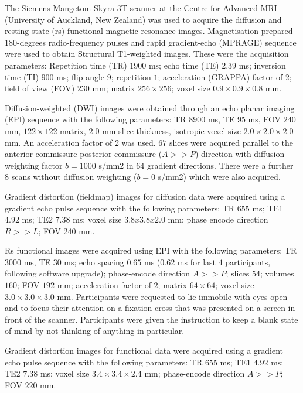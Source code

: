 The Siemens Mangetom Skyra 3T scanner at the Centre for Advanced MRI (University of Auckland, New Zealand) was used to acquire the diffusion and resting-state (rs) functional magnetic resonance images. Magnetisation prepared 180-degrees radio-frequency pulses and rapid gradient-echo (MPRAGE) sequence were used to obtain Structural T1-weighted images. These were the acquisition parameters: Repetition time (TR) $1900$ ms; echo time (TE) $2.39$ ms; inversion time (TI) $900$ ms; flip angle $9$\textdegree; repetition $1$; acceleration (GRAPPA) factor of $2$; field of view (FOV) $230$ mm; matrix $256 \times 256$; voxel size $0.9 \times 0.9 \times 0.8$ mm. 

Diffusion-weighted (DWI) images were obtained through an echo planar imaging (EPI) sequence with the following parameters: TR $8900$ ms, TE $95$ ms, FOV $240$ mm, $122 \times 122$ matrix, $2.0$ mm slice thickness, isotropic voxel size $2.0 \times 2.0 \times 2.0$ mm. An acceleration factor of $2$ was used. $67$ slices were acquired parallel to the anterior commissure-posterior commissure ($A >> P$) direction with diffusion-weighting factor $b=1000$ s/mm2 in $64$ gradient directions. There were a further $8$ scans without diffusion weighting ($b=0$ s/mm2) which were also acquired. 

Gradient distortion (fieldmap) images for diffusion data were acquired using a gradient echo pulse sequence with the following parameters: TR $655$ ms; TE1 $4.92$ ms; TE2 $7.38$ ms; voxel size $3.8 x 3.8 x 2.0$ mm; phase encode direction $R >> L$; FOV $240$ mm. 

Rs functional images were acquired using EPI with the following parameters: TR $3000$ ms, TE $30$ ms; echo spacing $0.65$ ms ($0.62$ ms for last $4$ participants, following software upgrade); phase-encode direction $A >> P$; slices $54$; volumes $160$; FOV $192$ mm; acceleration factor of $2$; matrix $64 \times 64$; voxel size $3.0 \times 3.0 \times 3.0$ mm. Participants were requested to lie immobile with eyes open and to focus their attention on a fixation cross that was presented on a screen in front of the scanner. Participants were given the instruction to keep a blank state of mind by not thinking of anything in particular.

Gradient distortion images for functional data were acquired using a gradient echo pulse sequence with the following parameters: TR $655$ ms; TE1 $4.92$ ms; TE2 $7.38$ ms; voxel size $3.4 \times 3.4 \times 2.4$ mm; phase-encode direction $A >> P$; FOV $220$ mm. 

